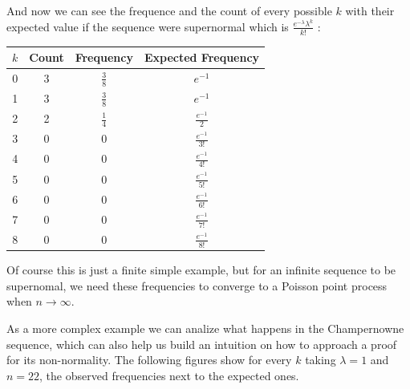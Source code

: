 \documentclass[11pt,a4paper]{tesis}
\theoremstyle{definition}
\begin{document}
And now we can see the frequence and the count of every possible $k$ with their expected value if the sequence were supernormal which is $\frac{e^{-\lambda}\lambda^k}{k!}$ :

\begin{center}
    \begin{tabular}{|c | c |  c| c |} 
    \hline
    $k$ & Count &  Frequency & Expected Frequency \\ [0.1ex] 
    \hline
    0 & 3 & $\frac{3}{8}$ & $e^{-1} $ \\ [0.5ex] 
    \hline
    1 & 3 &$\frac{3}{8}$ & $e^{-1} $ \\  [0.5ex] 
    \hline
    2 & 2 &$\frac{1}{4}$ & $\frac{e^{-1}}{2} $ \\  [0.5ex] 
    \hline
    3 & 0 & 0 & $\frac{e^{-1}}{3!} $ \\  [0.5ex] 
    \hline
    4 & 0 & 0 & $\frac{e^{-1}}{4!} $ \\ [0.5ex] 
    \hline
    5 & 0 & 0 & $\frac{e^{-1}}{5!} $ \\ [0.5ex] 
    \hline
    6 & 0 & 0  & $\frac{e^{-1}}{6!} $ \\ [0.5ex] 
    \hline
    7 & 0 & 0 & $\frac{e^{-1}}{7!} $ \\ [0.5ex] 
    \hline
    8 & 0 & 0 & $\frac{e^{-1}}{8!} $ \\  [0.5ex] 
    \hline
   \end{tabular}
\end{center}

Of course this is just a finite simple example, but for an infinite sequence to be supernomal, we need these frequencies to converge to a Poisson point process when $n \rightarrow \infty$. 

As a more complex example we can analize what happens in the Champernowne sequence, which can also help us build an intuition on how to approach a proof for its non-normality.
The following figures show for every $k$ taking $\lambda = 1$ and $n = 22$, the observed frequencies next to the expected ones.

\end{document}
